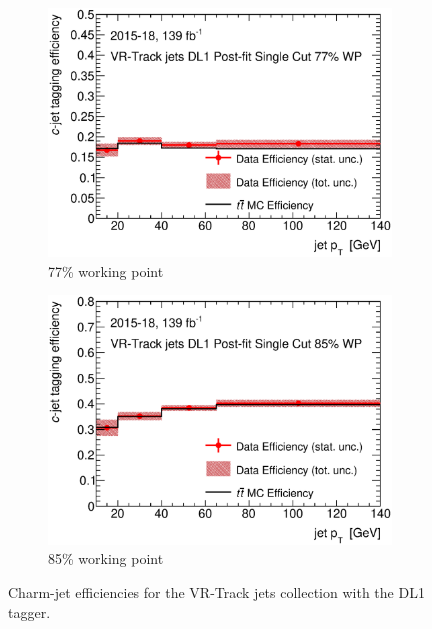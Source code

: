 \begin{figure}[H]
\begin{subfigure}[t]{.35\linewidth}
		\includegraphics[width=1\textwidth]{FTAG_plots/DL1allVRJetsDec/eff77.eps}
		\caption{77\% working point}
		\end{subfigure}
		\begin{subfigure}[t]{.35\linewidth}
		\includegraphics[width=1\textwidth]{FTAG_plots/DL1allVRJetsDec/eff85.eps}
		\caption{85\% working point}
		\end{subfigure}
	\caption{Charm-jet efficiencies for the VR-Track jets collection with
	the DL1 tagger.} \label{fig:Dec_eff_VRJets_DL1}
	\end{figure}

